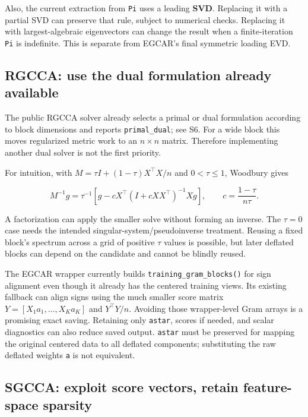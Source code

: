 \documentclass[
  11pt,
]{article}
\begin{document}
Also, the current extraction from \texttt{Pi} uses a leading
\textbf{SVD}. Replacing it with a partial SVD can preserve that rule,
subject to numerical checks. Replacing it with largest-algebraic
eigenvectors can change the result when a finite-iteration \texttt{Pi}
is indefinite. This is separate from EGCAR's final symmetric loading
EVD.

\hypertarget{rgcca-use-the-dual-formulation-already-available}{%
\subsection{RGCCA: use the dual formulation already
available}\label{rgcca-use-the-dual-formulation-already-available}}

The public RGCCA solver already selects a primal or dual formulation
according to block dimensions and reports \texttt{primal\_dual}; see S6.
For a wide block this moves regularized metric work to an \(n\times n\)
matrix. Therefore implementing another dual solver is not the first
priority.

For intuition, with \(M=\tau I+(1-\tau)X^\top X/n\) and \(0<\tau\leq1\),
Woodbury gives

\[
M^{-1}g=\tau^{-1}\left[g-cX^\top(I+cXX^\top)^{-1}Xg\right],
\qquad c=\frac{1-\tau}{n\tau}.
\]

A factorization can apply the smaller solve without forming an inverse.
The \(\tau=0\) case needs the intended singular-system/pseudoinverse
treatment. Reusing a fixed block's spectrum across a grid of positive
\(\tau\) values is possible, but later deflated blocks can depend on the
candidate and cannot be blindly reused.

The EGCAR wrapper currently builds \texttt{training\_gram\_blocks()} for
sign alignment even though it already has the centered training views.
Its existing fallback can align signs using the much smaller score
matrix \(Y=[X_1a_1,\ldots,X_Ka_K]\) and \(Y^\top Y/n\). Avoiding those
wrapper-level Gram arrays is a promising exact saving. Retaining only
\texttt{astar}, scores if needed, and scalar diagnostics can also reduce
saved output. \texttt{astar} must be preserved for mapping the original
centered data to all deflated components; substituting the raw deflated
weights \texttt{a} is not equivalent.

\hypertarget{sgcca-exploit-score-vectors-retain-feature-space-sparsity}{%
\subsection{SGCCA: exploit score vectors, retain feature-space
sparsity}\label{sgcca-exploit-score-vectors-retain-feature-space-sparsity}}
\end{document}
